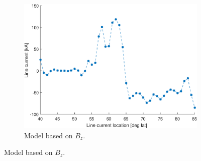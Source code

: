 \begin{figure}[ht]
    \centering
    \begin{subfigure}[b]{0.45\textwidth}
        \includegraphics[width=\textwidth]{fig/LCz.eps}
        \caption{Model based on $B_z$.}
        \label{fig:LCz}
    \end{subfigure}
    

\end{figure}
